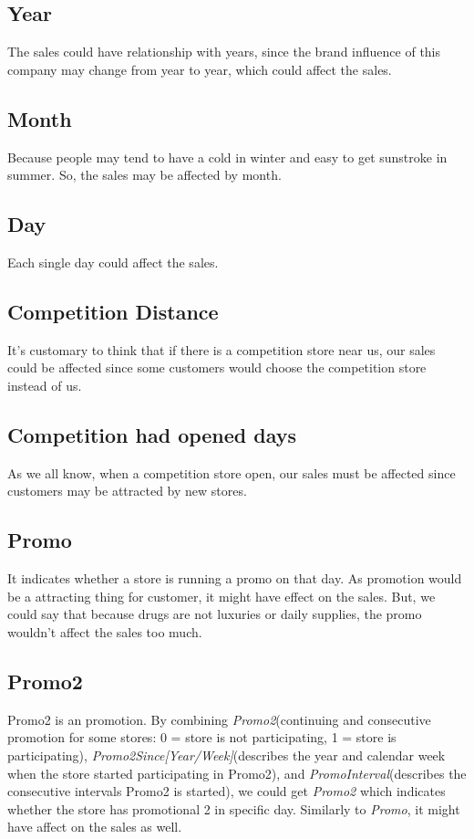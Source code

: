 \documentclass[jou,apacite]{apa6}
\begin{document}
\subsection{Year}
The sales could have relationship with years, since the brand influence of this company may change from year to year, which could affect the sales. 

\subsection{Month}
Because people may tend to have a cold in winter and easy to get sunstroke in summer. So, the sales may be affected by month.

\subsection{Day}
Each single day could affect the sales. 

\subsection{Competition Distance}
It's customary to think that if there is a competition store near us, our sales could be affected since some customers would choose the competition store instead of us.


\subsection{Competition had opened days}
As we all know, when a competition store open, our sales must be affected since customers may be attracted by new stores. 

\subsection{Promo}
It indicates whether a store is running a promo on that day. As promotion would be a attracting thing for customer, it might have effect on the sales. But, we could say that because drugs are not luxuries or daily supplies, the promo wouldn't affect the sales too much. 

\subsection{Promo2}
Promo2 is an promotion. By combining \textit{Promo2}(continuing and consecutive promotion for some stores: 0 = store is not participating, 1 = store is participating), \textit{Promo2Since[Year/Week]}(describes the year and calendar week when the store started participating in Promo2), and \textit{PromoInterval}(describes the consecutive intervals Promo2 is started), we could get \textit{Promo2} which indicates whether the store has promotional 2 in specific day. Similarly to \textit{Promo}, it might have affect on the sales as well.
\end{document}
